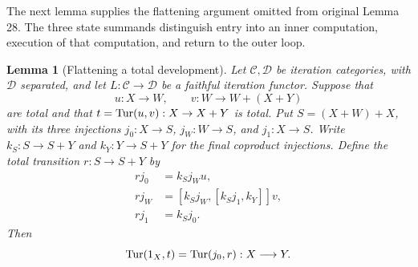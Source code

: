 \documentclass[11pt]{article}
\newtheorem{lemma}[theorem]{Lemma}
\newcommand{\C}{\mathcal C}\newcommand{\D}{\mathcal D}\newcommand{\B}{\mathcal B}
\begin{document}
The next lemma supplies the flattening argument omitted from original
Lemma 28. The three state summands distinguish entry into an inner
computation, execution of that computation, and return to the outer loop.

\begin{lemma}[Flattening a total development]\label{lem:flattening}
Let $\C,\D$ be iteration categories, with $\D$ separated, and let
$L:\C\to\D$ be a faithful iteration functor. Suppose that
\[
u:X\longrightarrow W,\qquad
v:W\longrightarrow W+(X+Y)
\]
are total and that $t=\operatorname{Tur}(u,v):X\to X+Y$ is total. Put
$S=(X+W)+X$, with its three injections
$j_0:X\to S$, $j_W:W\to S$, and $j_1:X\to S$.
Write $k_S:S\to S+Y$ and $k_Y:Y\to S+Y$ for the final coproduct
injections. Define the total transition $r:S\to S+Y$ by
\[
\begin{aligned}
rj_0&=k_Sj_Wu,\\
rj_W&=[k_Sj_W,[k_Sj_1,k_Y]]v,\\
rj_1&=k_Sj_0.
\end{aligned}
\]
Then
\begin{equation}\label{eq:flattening}
\operatorname{Tur}(1_X,t)=\operatorname{Tur}(j_0,r):X\longrightarrow Y.
\end{equation}
\end{lemma}
\end{document}

